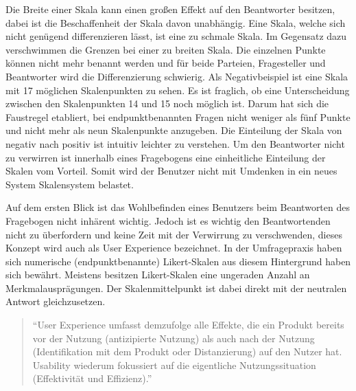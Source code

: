 Die Breite einer Skala kann einen großen Effekt auf den Beantworter besitzen, dabei ist die Beschaffenheit der Skala davon unabhängig.
Eine Skala, welche sich nicht genügend differenzieren lässt, ist eine zu schmale Skala.
Im Gegensatz dazu verschwimmen die Grenzen bei einer zu breiten Skala.
Die einzelnen Punkte können nicht mehr benannt werden und für beide Parteien, Fragesteller und Beantworter wird die Differenzierung schwierig.
Als Negativbeispiel ist eine Skala mit 17 möglichen Skalenpunkten zu sehen.
Es ist fraglich, ob eine Unterscheidung zwischen den Skalenpunkten 14 und 15 noch möglich ist.
Darum hat sich die Faustregel etabliert, bei endpunktbenannten Fragen nicht weniger als fünf Punkte und nicht mehr als neun Skalenpunkte anzugeben\autocite[S.87]{2014Fragebogen}. %
Die Einteilung der Skala von negativ nach positiv ist intuitiv leichter zu verstehen.
Um den Beantworter nicht zu verwirren ist innerhalb eines Fragebogens eine einheitliche Einteilung der Skalen vom Vorteil.
Somit wird der Benutzer nicht mit Umdenken in ein neues System Skalensystem belastet\autocite[S.89/90]{2014Fragebogen}. %

Auf dem ersten Blick ist das Wohlbefinden eines Benutzers beim Beantworten des Fragebogen nicht inhärent wichtig. 
Jedoch ist es wichtig den Beantwortenden nicht zu überfordern und keine Zeit mit der Verwirrung zu verschwenden, dieses Konzept wird auch als User Experience bezeichnet.
In der Umfragepraxis haben sich numerische (endpunktbenannte) Likert-Skalen aus diesem Hintergrund haben sich bewährt\autocite{Likert}. %
Meistens besitzen Likert-Skalen eine ungeraden Anzahl an Merkmalausprägungen.
Der Skalenmittelpunkt ist dabei direkt mit der neutralen Antwort gleichzusetzen\autocite{ISO}. \label{Likert} 

\begin{quote}
	\enquote{User Experience umfasst demzufolge alle Effekte, die ein Produkt bereits vor der Nutzung (antizipierte Nutzung) als auch nach der Nutzung (Identifikation mit dem Produkt oder Distanzierung) auf den Nutzer hat. Usability wiederum fokussiert auf die eigentliche Nutzungssituation (Effektivität und Effizienz).}\autocite{User}%
\end{quote}

